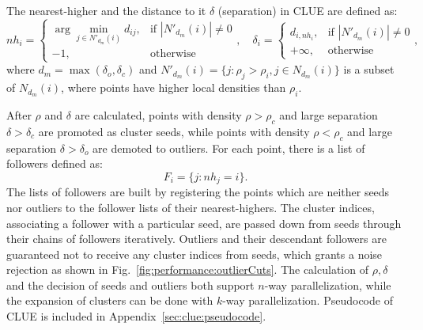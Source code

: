 The nearest-higher and the distance to it $\delta$ (separation) in CLUE are defined as:
\begin{equation} \label{eqn:algorithm:defineDelta}
    nh_i = 
    \begin{cases}
        \arg\min_{j \in N'_{d_m}(i) } d_{ij},   & \text{if } |N'_{d_m}(i)| \neq 0  \\
        -1,                                     & \text{otherwise}
    \end{cases}, 
    \quad
    \delta_i = 
    \begin{cases}
        d_{i,nh_i}, & \text{if }  |N'_{d_m}(i)| \neq 0 \\
        +\infty,    & \text{otherwise}
    \end{cases},
\end{equation}
\noindent where $d_m= \max (\delta_o, \delta_c)$ and $N'_{d_m}(i) = \{ j : \rho_j > \rho_i, j \in N_{d_m}(i) \}$ is a subset of $N_{d_m}(i)$, where points have higher local densities than $\rho_i$. 

After $\rho$ and $\delta$ are calculated, points with density $\rho>\rho_c$ and large separation $\delta>\delta_c$ are promoted as cluster seeds, while points with density $\rho<\rho_c$ and large separation $\delta>\delta_o$ are demoted to outliers. For each point, there is a list of followers defined as:
\begin{equation} \label{eqn:algorithm:defineFollowers}
    F_i = \{j : nh_j=i \}.
\end{equation}
\noindent The lists of followers are built by registering the points which are neither seeds nor outliers to the follower lists of their nearest-highers. The cluster indices, associating a follower with a particular seed, are passed down from seeds through their chains of followers iteratively. Outliers and their descendant followers are guaranteed not to receive any cluster indices from seeds, which grants a noise rejection as shown in Fig.~\ref{fig:performance:outlierCuts}. The calculation of $\rho, \delta$ and the decision of seeds and outliers both support $n$-way parallelization, while the expansion of clusters can be done with $k$-way parallelization.
Pseudocode of CLUE is included in Appendix~\ref{sec:clue:pseudocode}.




